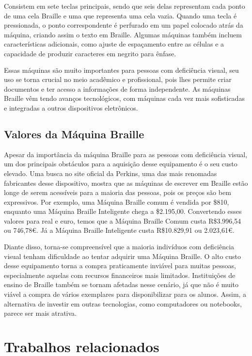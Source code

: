 Consistem em sete teclas principais, sendo que seis delas representam cada ponto de uma cela Braille e uma que representa uma cela vazia. Quando uma tecla é pressionada, o ponto correspondente é perfurado em um papel colocado atrás da máquina, criando assim o texto em Braille. Algumas máquinas também incluem características adicionais, como ajuste de espaçamento entre as células e a capacidade de produzir caracteres em negrito para ênfase.

Essas máquinas são muito importantes para pessoas com deficiência visual, seu uso se torna crucial no meio acadêmico e profissional, pois lhes permite criar documentos e ter acesso a informações de forma independente. As máquinas Braille vêm tendo avanços tecnológicos, com máquinas cada vez mais sofisticadas e integradas a outros dispositivos eletrônicos.

\subsection{Valores da Máquina Braille}
\label{sec:ch02_Valores_da_Maquina_Braille}

Apesar da importância da máquina Braille para as pessoas com deficiência visual, um dos principais obstáculos para a aquisição desse equipamento é o seu custo elevado. Uma busca no site oficial da Perkins, uma das mais renomadas fabricantes desse dispositivo, mostra que as máquinas de escrever em Braille estão longe de serem acessíveis para a maioria das pessoas, pois os preços são bem expressivos. Por exemplo, uma Máquina Braille comum é vendida por \$810, enquanto uma Máquina Braille Inteligente chega a \$2.195,00. Convertendo esses valores para real e euro, temos que a Máquina Braille Comum custa R\$3.996,54 ou 746,78€. Já a Máquina Braille Inteligente custa R\$10.829,91 ou 2.023,61€.

Diante disso, torna-se compreensível que a maioria indivíduos com deficiência visual tenham dificuldade ao tentar adquirir uma Máquina Braille. O alto custo desse equipamento torna a compra praticamente inviável para muitas pessoas, especialmente aquelas com recursos financeiros mais limitados. Instituições de ensino de Braille também se tornam afetadas nesse cenário, já que não é muito viável a compra de vários exemplares para disponibilizar para os alunos. Assim, a alternativa de investir em outras tecnologias, como computadores ou notebooks, parece ser mais atrativa.

\section{Trabalhos relacionados}

